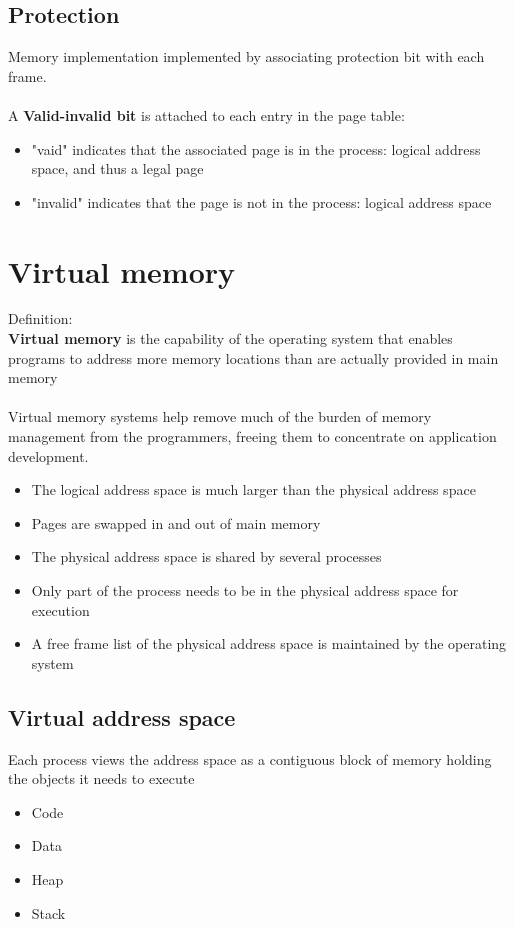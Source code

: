 \documentclass{article}[18pt]
\begin{document}
\subsection{Protection}
Memory implementation implemented by associating protection bit with each frame.\\
\\
A \textbf{Valid-invalid bit} is attached to each entry in the page table:
\begin{itemize}
	\item "vaid" indicates that the associated page is in the process: logical address space, and thus a legal page
	\item "invalid" indicates that the page is not in the process: logical address space
\end{itemize}
\section{Virtual memory}
Definition:\\
\textbf{Virtual memory} is the capability of the operating system that enables programs to address more memory locations than are actually provided in main memory\\
\\
Virtual memory systems help remove much of the burden of memory management from the programmers, freeing them to concentrate on application development.
\begin{itemize}
	\item The logical address space is much larger than the physical address space
	\item Pages are swapped in and out of main memory
	\item The physical address space is shared by several processes
	\item Only part of the process needs to be in the physical address space for execution
	\item A free frame list of the physical address space is maintained by the operating system
\end{itemize}
\subsection{Virtual address space}
Each process views the address space as a contiguous block of memory holding the objects it needs to execute
\begin{itemize}
	\item Code
	\item Data
	\item Heap
	\item Stack
\end{itemize}
\end{document}

